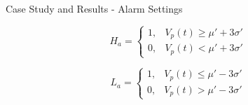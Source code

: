 \begin{frame}{Case Study and Results - Alarm Settings}

\begin{equation}
H_{a} = \left\{
\begin{matrix}
 1 , & V_p(t)   \geq \mu' + 3\sigma' & \\
 0,  & V_p(t)  < \mu' + 3\sigma'
\end{matrix} \right.
\label{eq:threshAlarm}
\end{equation}


\begin{equation}
    L_{a} = \left\{
    \begin{matrix}
     1 , & V_p(t)   \leq \mu' - 3\sigma' & \\
     0,  & V_p(t)  > \mu' - 3\sigma'
    \end{matrix} \right.
    \label{eq:threshAlrmLow}
    \end{equation}

\end{frame}

